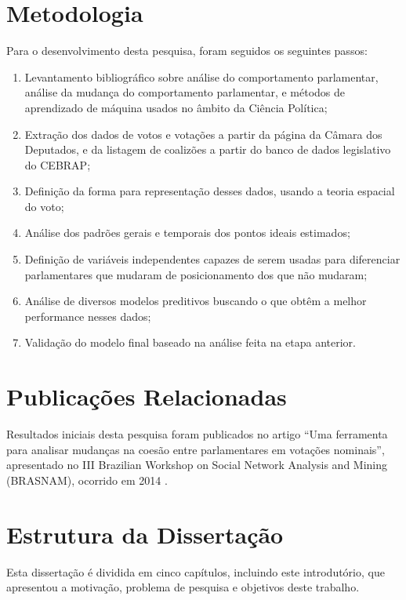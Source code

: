 \section{Metodologia}

Para o desenvolvimento desta pesquisa, foram seguidos os seguintes passos:

\begin{enumerate}
  \item Levantamento bibliográfico sobre análise do comportamento parlamentar,
    análise da mudança do comportamento parlamentar, e métodos de aprendizado
    de máquina usados no âmbito da Ciência Política;
  \item Extração dos dados de votos e votações a partir da página da Câmara dos
    Deputados, e da listagem de coalizões a partir do banco de dados
    legislativo do \gls{CEBRAP};
  \item Definição da forma para representação desses dados, usando a teoria
    espacial do voto;
  \item Análise dos padrões gerais e temporais dos pontos ideais estimados;
  \item Definição de variáveis independentes capazes de serem usadas para
    diferenciar parlamentares que mudaram de posicionamento dos que não
    mudaram;
  \item Análise de diversos modelos preditivos buscando o que obtêm a melhor
    performance nesses dados;
  \item Validação do modelo final baseado na análise feita na etapa anterior.
\end{enumerate}

\section{Publicações Relacionadas}

Resultados iniciais desta pesquisa foram publicados no artigo ``Uma ferramenta
para analisar mudanças na coesão entre parlamentares em votações nominais'',
apresentado no III Brazilian Workshop on Social Network Analysis and Mining
(BRASNAM), ocorrido em 2014 \cite{Baptista2014}.

\section{Estrutura da Dissertação}

Esta dissertação é dividida em cinco capítulos, incluindo este introdutório,
que apresentou a motivação, problema de pesquisa e objetivos deste trabalho.

